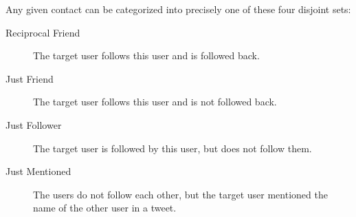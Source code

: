 Any given contact can be categorized into precisely one of these four disjoint
sets:
\begin{description}
\item[Reciprocal Friend] The target user follows this user and is followed
    back.
\item[Just Friend] The target user follows this user and is not followed
    back.
\item[Just Follower] The target user is followed by this user, but does
    not follow them.
\item[Just Mentioned] The users do not follow each other, but the target
    user mentioned the name of the other user in a tweet.
\end{description}

%
%



